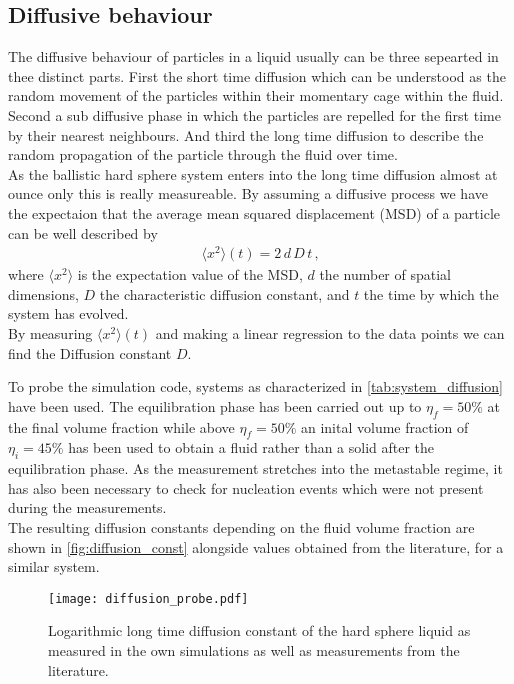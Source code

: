 \subsection{Diffusive behaviour}
\label{sec:diffusion_probe}
The diffusive behaviour of particles in a liquid usually can be three sepearted in thee distinct parts. First the short time diffusion which can be understood as the random movement of the particles within their momentary cage within the fluid. Second a sub diffusive phase in which the particles are repelled for the first time by their nearest neighbours. And third the long time diffusion to describe the random propagation of the particle through the fluid over time.\\
   
As the ballistic hard sphere system enters into the long time diffusion almost at ounce only this is really measureable. By assuming a diffusive process we have the expectaion that the average mean squared displacement (MSD) of a particle can be well described by 
\begin{align}
\label{eqn:diffusion}
\langle x^2 \rangle(t) = 2 \, d \, D \, t  \, \text{,}
\end{align}
where $\langle x^2 \rangle$ is the expectation value of the MSD, $d$ the number of spatial dimensions, $D$ the characteristic diffusion constant, and $t$ the time by which the system has evolved.\\

By measuring $\langle x^2 \rangle (t)$ and making a linear regression to the data points we can find the Diffusion constant $D$.

To probe the simulation code, systems as characterized in \autoref{tab:system_diffusion} have been used. The equilibration phase has been carried out up to $\eta_f = 50\%$ at the final volume fraction while above $\eta_f =  50\% $ an inital volume fraction of $\eta_i = 45\%$ has been used to obtain a fluid rather than a solid after the equilibration phase. As the measurement stretches into the metastable regime, it has also been necessary to check for nucleation events which were not present during the measurements.\\

The resulting diffusion constants depending on the fluid volume fraction are shown in \autoref{fig:diffusion_const} alongside values obtained from the literature, for a similar system.\\

\begin{figure}[h]
\centering
\texttt{[image: diffusion\_probe.pdf]}
\caption{Logarithmic long time diffusion constant of the hard sphere liquid as measured in the own simulations as well as measurements from the literature. }
\label{fig:diffusion_const}
\end{figure}

